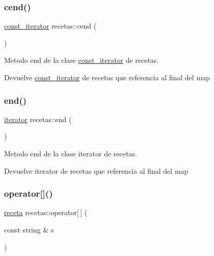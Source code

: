 \subsubsection{\texorpdfstring{cend()}{cend()}}
{\footnotesize\ttfamily \hyperlink{classrecetas_1_1const__iterator}{const\+\_\+iterator} recetas\+::cend (\begin{DoxyParamCaption}{ }\end{DoxyParamCaption})\hspace{0.3cm}{\ttfamily [inline]}}



Metodo end de la clase \hyperlink{classrecetas_1_1const__iterator}{const\+\_\+iterator} de recetas. 

\begin{DoxyReturn}{Devuelve}
\hyperlink{classrecetas_1_1const__iterator}{const\+\_\+iterator} de recetas que referencia al final del map 
\end{DoxyReturn}
\mbox{\label{classrecetas_a3860f782624bed9fffb7ec4eaddee97c}} 
\subsubsection{\texorpdfstring{end()}{end()}}
{\footnotesize\ttfamily \hyperlink{classrecetas_1_1iterator}{iterator} recetas\+::end (\begin{DoxyParamCaption}{ }\end{DoxyParamCaption})\hspace{0.3cm}{\ttfamily [inline]}}



Metodo end de la clase iterator de recetas. 

\begin{DoxyReturn}{Devuelve}
iterator de recetas que referencia al final del map 
\end{DoxyReturn}
\mbox{\label{classrecetas_aed14cb0dd493f758dfb3e20efbeead12}} 
\subsubsection{\texorpdfstring{operator[]()}{operator[]()}}
{\footnotesize\ttfamily \hyperlink{classreceta}{receta} recetas\+::operator\mbox{[}$\,$\mbox{]} (\begin{DoxyParamCaption}\item[{const string \&}]{s }\end{DoxyParamCaption})}



